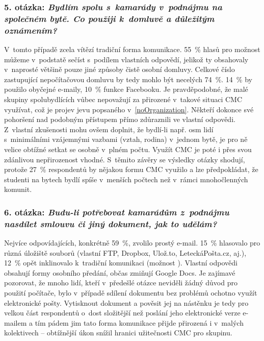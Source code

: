 \documentclass[12pt,oneside,final]{fithesis2}
\begin{document}
\subsubsection*{\textbf{5. otázka:} \emph{Bydlím spolu s~kamarády v~podnájmu na společném bytě. Co použiji k~domluvě a důležitým oznámením?}}
V~tomto případě zcela vítězí tradiční forma komunikace. 55~\% hlasů pro možnost  můžeme v~podstatě sečíst s~podílem vlastních odpovědí, jelikož ty obsahovaly v~naprosté většině pouze jiné způsoby čistě osobní domluvy. Celkové číslo zastupující nepočítačovou domluvu by tedy mohlo být necelých 74~\%. 14~\% by použilo obyčejné e-maily, 10~\% funkce Facebooku. Je pravděpodobné, že malé skupiny spolubydlících vůbec nepovažují za přirozené v~takové situaci CMC využívat, což je projev jevu popsaného v~\ref{noOrganization}. Někteří dokonce své pohoršení nad podobným přístupem přímo zdůraznili ve vlastní odpovědi. Z~vlastní zkušenosti mohu ovšem doplnit, že bydlí-li např. osm lidí s~minimálními vzájemnými vazbami (vztah, rodina) v~jednom bytě, je pro ně velice obtížné setkat se osobně v~plném počtu. Využít CMC je poté i přes svou zdánlivou nepřirozenost vhodné. S~těmito závěry se výsledky otázky shodují, protože 27~\% respondentů by nějakou formu CMC využilo a lze předpokládat, že studenti na bytech bydlí spíše v~menších počtech než v~rámci mnohočlenných komunit.

\subsubsection*{\textbf{6. otázka:} \emph{Budu-li potřebovat kamarádům z~podnájmu nasdílet smlouvu či jiný dokument, jak to udělám?}}
Nejvíce odpovídajících, konkrétně 59~\%, zvolilo prostý e-mail. 15~\% hlasovalo pro různá úložiště souborů (vlastní FTP, Dropbox, Ulož.to, LeteckáPošta.cz, aj.), 12~\% opět inklinovalo k~tradiční komunikaci (možnost ). Vlastní odpovědi obsahují formy osobního předání, občas zmiňují Google Docs. Je zajímavé pozorovat, že mnoho lidí, kteří v~předešlé otázce neviděli žádný důvod pro použití počítače, bylo v~případě sdílení dokumentu bez problémů ochotno využít elektronické pošty. Vytisknout dokument a pověsit jej na nástěnku je tedy pro velkou část respondentů o~dost složitější než poslání jeho elektronické verze e-mailem a tím pádem jim tato forma komunikace přijde přirozená i v~malých kolektivech -- obtížnější úkon snížil hranici užitečnosti CMC pro skupinu.
\end{document}
